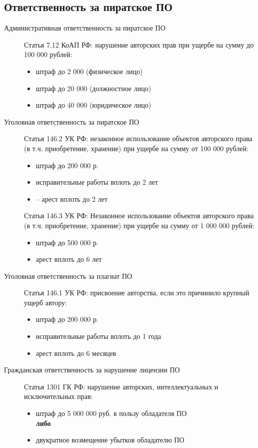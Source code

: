 \subsection{Ответственность за пиратское ПО}
\begin{description}
  \item[Административная ответственность за пиратское ПО] Статья 7.12 КоАП РФ: нарушение авторских прав при ущербе на сумму до 100 000 рублей:
  \begin{itemize}
    \item штраф до 2 000 (физическое лицо)
    \item штраф до 20 000 (должностное лицо)
    \item штраф до 40 000 (юридическое лицо)
  \end{itemize}
  \item[Уголовная ответственность за пиратское ПО] Статья 146.2 УК РФ: незаконное использование объектов авторского права (в т.ч. приобретение, хранение) при ущербе на сумму от 100 000 рублей:
\begin{itemize}
  \item штраф до 200 000 р.
  \item исправительные работы вплоть до 2 лет
  \item – арест вплоть до 2 лет
\end{itemize}
 Статья 146.3 УК РФ: Незаконное использование объектов авторского права (в т.ч. приобретение, хранение) при ущербе на сумму от 1 000 000 рублей:
  \begin{itemize}
    \item штраф до 500 000 р.
    \item арест вплоть до 6 лет
  \end{itemize}
  \item[Уголовная ответственность за плагиат ПО] Статья 146.1 УК РФ: присвоение авторства, если это причинило крупный ущерб автору:
 \begin{itemize}
   \item штраф до 200 000 р.
   \item исправительные работы вплоть до 1 года
   \item арест вплоть до 6 месяцев
 \end{itemize}
  \item[Гражданская ответственность за нарушение лицензии ПО]  Статья 1301 ГК РФ: нарушение авторских, интеллектуальных и исключительных прав:
  \begin{itemize}
    \item штраф до 5 000 000 руб. в пользу обладателя ПО
    \\\textbf{либо}
    \item двукратное возмещение убытков обладателю ПО
  \end{itemize}
\end{description}
